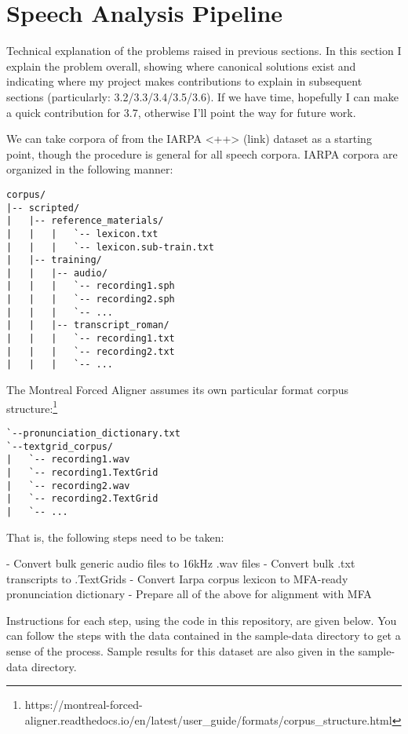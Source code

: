 \documentclass[11pt]{article}
\begin{document}
\section{Speech Analysis Pipeline}

Technical explanation of the problems raised in previous sections. In this section I explain the problem overall, showing where canonical solutions exist and indicating where my project makes contributions to explain in subsequent sections (particularly: 3.2/3.3/3.4/3.5/3.6). If we have time, hopefully I can make a quick contribution for 3.7, otherwise I'll point the way for future work.

We can take corpora of from the IARPA <++> (link) dataset as a starting point, though the procedure is general for all speech corpora. IARPA corpora are organized in the following manner:
\begin{singlespace}
\begin{verbatim}
corpus/
|-- scripted/
|   |-- reference_materials/
|   |   |   `-- lexicon.txt
|   |   |   `-- lexicon.sub-train.txt
|   |-- training/
|   |   |-- audio/
|   |   |   `-- recording1.sph
|   |   |   `-- recording2.sph
|   |   |   `-- ...
|   |   |-- transcript_roman/
|   |   |   `-- recording1.txt
|   |   |   `-- recording2.txt
|   |   |   `-- ...
\end{verbatim}
\end{singlespace}

The Montreal Forced Aligner assumes its own particular format corpus structure:\footnote{https://montreal-forced-aligner.readthedocs.io/en/latest/user\_guide/formats/corpus\_structure.html}

\begin{singlespace}
\begin{verbatim}
`--pronunciation_dictionary.txt
`--textgrid_corpus/
|   `-- recording1.wav
|   `-- recording1.TextGrid
|   `-- recording2.wav
|   `-- recording2.TextGrid
|   `-- ...
\end{verbatim}
\end{singlespace}

That is, the following steps need to be taken:

- Convert bulk generic audio files to 16kHz .wav files
- Convert bulk .txt transcripts to .TextGrids
- Convert Iarpa corpus lexicon to MFA-ready pronunciation dictionary
- Prepare all of the above for alignment with MFA

Instructions for each step, using the code in this repository, are given below. You can follow the steps with the data contained in the sample-data directory to get a sense of the process. Sample results for this dataset are also given in the sample-data directory.
\end{document}
